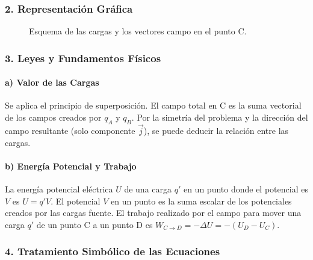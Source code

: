 \subsubsection*{2. Representación Gráfica}
\begin{figure}[H]
    \centering
    \caption{Esquema de las cargas y los vectores campo en el punto C.}
\end{figure}
\subsubsection*{3. Leyes y Fundamentos Físicos}
\paragraph*{a) Valor de las Cargas}
Se aplica el principio de superposición. El campo total en C es la suma vectorial de los campos creados por $q_A$ y $q_B$. Por la simetría del problema y la dirección del campo resultante (solo componente $\vec{j}$), se puede deducir la relación entre las cargas.
\paragraph*{b) Energía Potencial y Trabajo}
La energía potencial eléctrica $U$ de una carga $q'$ en un punto donde el potencial es $V$ es $U = q'V$. El potencial $V$ en un punto es la suma escalar de los potenciales creados por las cargas fuente. El trabajo realizado por el campo para mover una carga $q'$ de un punto C a un punto D es $W_{C \to D} = - \Delta U = -(U_D - U_C)$.

\subsubsection*{4. Tratamiento Simbólico de las Ecuaciones}

